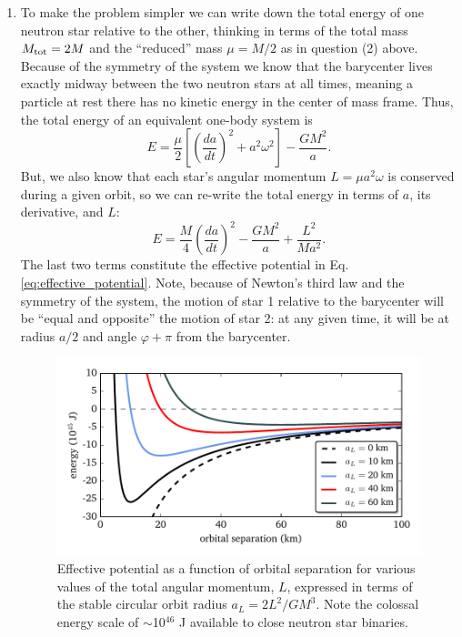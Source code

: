 \documentclass[11pt]{article}
\begin{document}
\begin{enumerate}
\item To make the problem simpler we can write down the total energy of one neutron star relative to the other, thinking in terms of the total mass $M_{\rm tot} = 2M$ and the ``reduced'' mass $\mu = M/2$ as in question (2) above. Because of the symmetry of the system we know that the barycenter lives exactly midway between the two neutron stars at all times, meaning a particle at rest there has no kinetic energy in the center of mass frame. Thus, the total energy of an equivalent one-body system is \[ E = \frac{\mu}{2} \left[ \left(\frac{da}{dt}\right)^2 + a^2\omega^2 \right] - \frac{GM^2}{a}. \] But, we also know that each star's angular momentum $L = \mu a^2\omega$ is conserved during a given orbit, so we can re-write the total energy in terms of $a$, its derivative, and $L$:
\begin{equation}
E = \frac{M}{4}\left(\frac{da}{dt}\right)^2 - \frac{GM^2}{a} + \frac{L^2}{Ma^2}.
\end{equation}
The last two terms constitute the effective potential in Eq. \ref{eq:effective_potential}. Note, because of Newton's third law and the symmetry of the system, the motion of star 1 relative to the barycenter will be ``equal and opposite'' the motion of star 2: at any given time, it will be at radius $a/2$ and angle $\varphi + \pi$ from the barycenter.

\begin{figure}[!b]
\centering
\includegraphics[scale=1]{keplerian_orbit/kepler_potentials.pdf}
\caption{\label{fig:potentials} Effective potential as a function of orbital separation for various values of the total angular momentum, $L$, expressed in terms of the stable circular orbit radius $a_L = 2L^2/GM^3$. Note the colossal energy scale of $\sim$10$^{46}$ J available to close neutron star binaries.}
\end{figure}


\end{enumerate}
\end{document}
